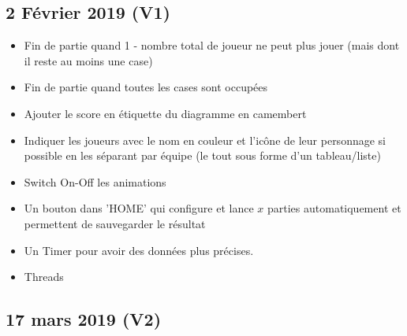 \documentclass[11pt,a4paper]{article}
\begin{document}

\subsection{2 Février 2019 (V1)}
%
\begin{itemize}[label=\XSolidBrush, font=\color{rouge}]
    \item Fin de partie quand 1 - nombre total de joueur ne peut plus jouer (mais dont il reste au moins une case)
    \item Fin de partie quand toutes les cases sont occupées
\end{itemize}
%
\begin{itemize}[label=\Peace, font=\large \color{rouge}]
    \item Ajouter le score en étiquette du diagramme en camembert
    \item Indiquer les joueurs avec le nom en couleur et l'icône de leur personnage si possible en les séparant par équipe (le tout sous forme d'un tableau/liste)
    \item Switch On-Off les animations
    \item Un bouton dans 'HOME' qui configure et lance $x$ parties automatiquement et permettent de sauvegarder le résultat
    \item Un Timer pour avoir des données plus précises.
    \item Threads
\end{itemize}


\subsection{17 mars 2019 (V2)}
\end{document}
